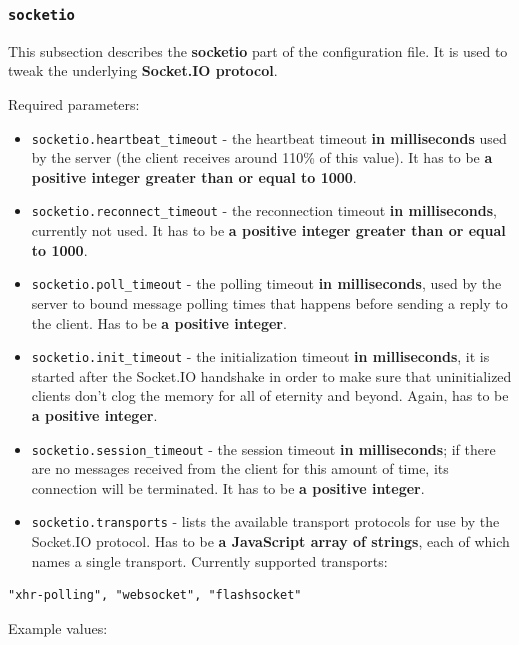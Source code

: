 \documentclass[a4paper]{article}
\begin{document}
\subsubsection{\texttt{socketio}}
\label{sec-3-1-2}

This subsection describes the \textbf{socketio} part of the configuration file. It is used to tweak the underlying \textbf{Socket.IO protocol}.

\noindent
Required parameters:

\begin{itemize}
\item \texttt{socketio.heartbeat\_timeout} - the heartbeat timeout \textbf{in milliseconds} used by the server (the client receives around 110\% of this value). It has to be \textbf{a positive integer greater than or equal to 1000}.
\item \texttt{socketio.reconnect\_timeout} - the reconnection timeout \textbf{in milliseconds}, currently not used. It has to be \textbf{a positive integer greater than or equal to 1000}.
\item \texttt{socketio.poll\_timeout} - the polling timeout \textbf{in milliseconds}, used by the server to bound message polling times that happens before sending a reply to the client. Has to be \textbf{a positive integer}.
\item \texttt{socketio.init\_timeout} - the initialization timeout \textbf{in milliseconds}, it is started after the Socket.IO handshake in order to make sure that uninitialized clients don't clog the memory for all of eternity and beyond. Again, has to be \textbf{a positive integer}.
\item \texttt{socketio.session\_timeout} - the session timeout \textbf{in milliseconds}; if there are no messages received from the client for this amount of time, its connection will be terminated. It has to be \textbf{a positive integer}.
\item \texttt{socketio.transports} - lists the available transport protocols for use by the Socket.IO protocol. Has to be \textbf{a JavaScript array of strings}, each of which names a single transport. Currently supported transports:
\end{itemize}


\begin{verbatim}
"xhr-polling", "websocket", "flashsocket"
\end{verbatim}




\noindent
Example values:
\end{document}
